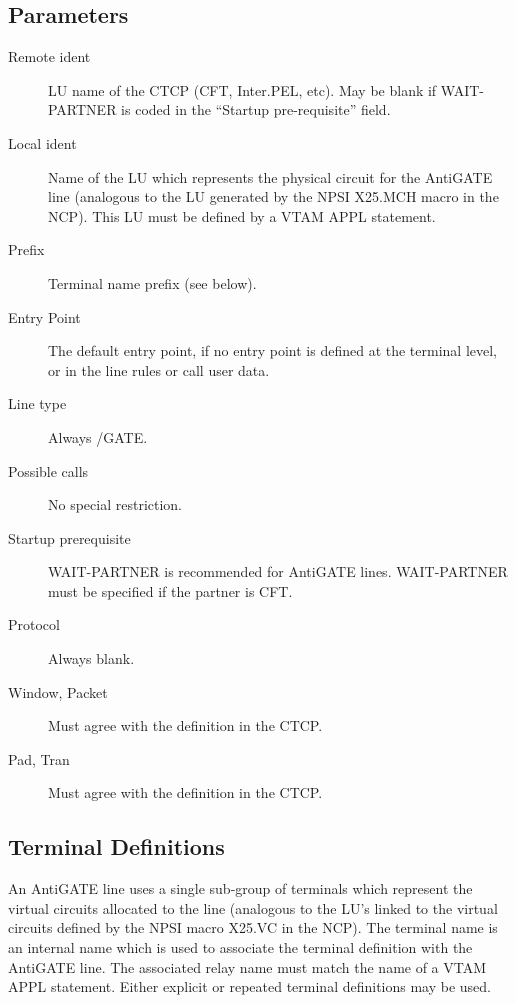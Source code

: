 \documentclass[letterpaper,10pt,english]{sphinxmanual}
\begin{document}
\subsection{Parameters}
\label{\detokenize{connectivity_guide:index-75}}\label{\detokenize{connectivity_guide:id34}}\begin{description}
\item[{Remote ident}] \leavevmode
LU name of the CTCP (CFT, Inter.PEL, etc). May be blank if WAIT-PARTNER is coded in the “Startup pre-requisite” field.

\item[{Local ident}] \leavevmode
Name of the LU which represents the physical circuit for the AntiGATE line (analogous to the LU generated by the NPSI X25.MCH
macro in the NCP). This LU must be defined by a VTAM APPL statement.

\item[{Prefix}] \leavevmode
Terminal name prefix (see below).

\item[{Entry Point}] \leavevmode
The default entry point, if no entry point is defined at the terminal level, or in the line rules or call user data.

\item[{Line type}] \leavevmode
Always /GATE.

\item[{Possible calls}] \leavevmode
No special restriction.

\item[{Startup prerequisite}] \leavevmode
WAIT-PARTNER is recommended for AntiGATE lines. WAIT-PARTNER must be specified if the partner is CFT.

\item[{Protocol}] \leavevmode
Always blank.

\item[{Window, Packet}] \leavevmode
Must agree with the definition in the CTCP.

\item[{Pad, Tran}] \leavevmode
Must agree with the definition in the CTCP.

\end{description}


\subsection{Terminal Definitions}
\label{\detokenize{connectivity_guide:index-76}}\label{\detokenize{connectivity_guide:id35}}
An AntiGATE line uses a single sub-group of terminals which represent the virtual circuits allocated to the line (analogous to the LU’s linked to the virtual circuits defined by the NPSI macro X25.VC in the NCP). The terminal name is an internal name which is used to associate the terminal definition with the AntiGATE line. The associated relay name must match the name of a VTAM APPL statement. Either explicit or repeated terminal definitions may be used.
\end{document}
